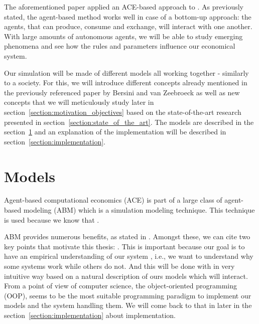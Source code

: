 \documentclass[12pt]{article}
\begin{document}
The aforementioned paper applied an ACE-based approach to . As previously stated, the agent-based method works well in case of a bottom-up approach: the agents, that can  produce, consume and exchange, will interact with one another. With large amounts of autonomous agents, we will be able to study emerging phenomena and see how the rules and parameters influence our economical system.

Our simulation will be made of different models all working together - similarly to a society. For this, we will introduce different concepts already mentioned in the previously referenced paper by Bersini and van Zeebroeck as well as new concepts that we will meticulously study later in section~\ref{section:motivation_objectives} based on the state-of-the-art research presented in section~\ref{section:state_of_the_art}. The models are described in the section~\ref{section:models} and an explanation of the implementation will be described in section~\ref{section:implementation}.

\section{Models}\label{section:models}

Agent-based computational economics (ACE) is part of a large class of agent-based modeling (ABM) which is a simulation modeling technique. This technique is used because we know that .\cite{ABM}

ABM provides numerous benefits, as stated in \cite{ABM}. Amongst these, we can cite two key points that motivate this thesis: . This is important because our goal is to have an empirical understanding of our system \cite{tesfatsion_handbook}, i.e., we want to understand why some systems work while others do not. And this will be done with in very intuitive way based on a natural description of ours models which will interact.
From a point of view of computer science, the object-oriented programming (OOP), seems to be the most suitable programming paradigm to implement our models and the system handling them. We will come back to that in later in the section~\ref{section:implementation} about implementation.
\end{document}
